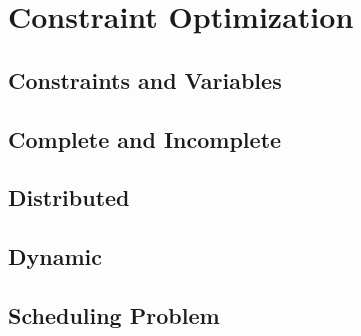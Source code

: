 \chapter{Constraint Optimization}
\section{Constraints and Variables}
\section{Complete and Incomplete}
\section{Distributed}
\section{Dynamic}
\section{Scheduling Problem}